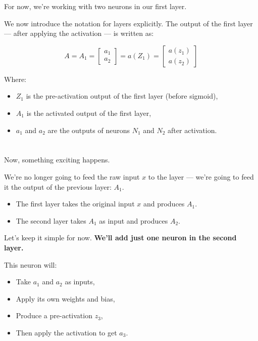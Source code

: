 \documentclass[11pt]{article}
\begin{document}
For now, we’re working with two neurons in our first layer.

We now introduce the notation for layers explicitly.  
The output of the first layer — after applying the activation — is written as:

\[
A = A_1 = 
\begin{bmatrix}
a_1 \\
a_2
\end{bmatrix}
= a(Z_1) =
\begin{bmatrix}
a(z_1) \\
a(z_2)
\end{bmatrix}
\]

Where:
\begin{itemize}
  \item $Z_1$ is the pre-activation output of the first layer (before sigmoid),
  \item $A_1$ is the activated output of the first layer,
  \item $a_1$ and $a_2$ are the outputs of neurons $N_1$ and $N_2$ after activation.
\end{itemize}

\vspace{2em}

\section*{}

Now, something exciting happens.

We’re no longer going to feed the raw input $x$ to the layer —  
we’re going to feed it the output of the previous layer: $A_1$.

\begin{tcolorbox}[colback=blue!5, colframe=blue!80!black, title=Deep Architecture]
\begin{itemize}
    \item The first layer takes the original input $x$ and produces $A_1$.
    \item The second layer takes $A_1$ as input and produces $A_2$.
\end{itemize}
\end{tcolorbox}

\vspace{1em}

Let’s keep it simple for now.  
\textbf{We’ll add just one neuron in the second layer.}

This neuron will:
\begin{itemize}
  \item Take $a_1$ and $a_2$ as inputs,
  \item Apply its own weights and bias,
  \item Produce a pre-activation $z_3$,
  \item Then apply the activation to get $a_3$.
\end{itemize}
\end{document}
